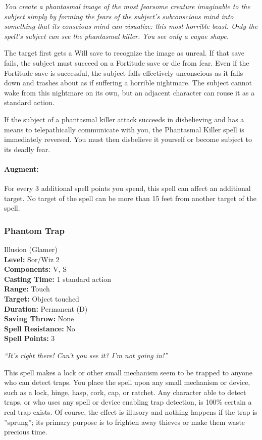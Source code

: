 \emph{You create a phantasmal image of the most fearsome creature imaginable to the subject simply by 
forming the fears of the subject's subconscious mind into something that its conscious mind can visualize: 
this most horrible beast. Only the spell's subject can see the phantasmal killer. You see only a vague shape.} 

The target first gets a Will save to recognize the image as unreal. 
If that save fails, the subject must succeed on a Fortitude save or die from fear. 
Even if the Fortitude save is successful, the subject falls effectively unconscious as it falls down and trashes about
as if suffering a horrible nightmare. The subject cannot wake from this nightmare on its own, but an adjacent character can
rouse it as a standard action.

If the subject of a phantasmal killer attack succeeds in disbelieving and has a means to telepathically communicate with you, the Phantasmal Killer spell is immediately reversed. You must then disbelieve it yourself or become subject to its deadly fear.

\paragraph{Augment:}
For every 3 additional spell points you spend, this spell can affect an additional target.
No target of the spell can be more than 15 feet from another target of the spell.
\subsubsection{Phantom Trap}
\label{Spell:PhantomTrap}
Illusion (Glamer)
\\ \textbf{Level:} Sor/Wiz 2
\\ \textbf{Components:} V, S
\\ \textbf{Casting Time:} 1 standard action
\\ \textbf{Range:} Touch
\\ \textbf{Target:} Object touched
\\ \textbf{Duration:} Permanent (D)
\\ \textbf{Saving Throw:} None
\\ \textbf{Spell Resistance:} No
\\ \textbf{Spell Points:} 3

\emph{``It's right there! Can't you see it? I'm not going in!''}

This spell makes a lock or other small mechanism seem to be trapped to anyone who can detect traps. 
You place the spell upon any small mechanism or device, such as a lock, hinge, hasp, cork, cap, or ratchet. 
Any character able to detect traps, or who uses any spell or device enabling trap detection, 
is 100\% certain a real trap exists. Of course, the effect is illusory and nothing happens if the trap is ''sprung''; 
its primary purpose is to frighten away thieves or make them waste precious time.

